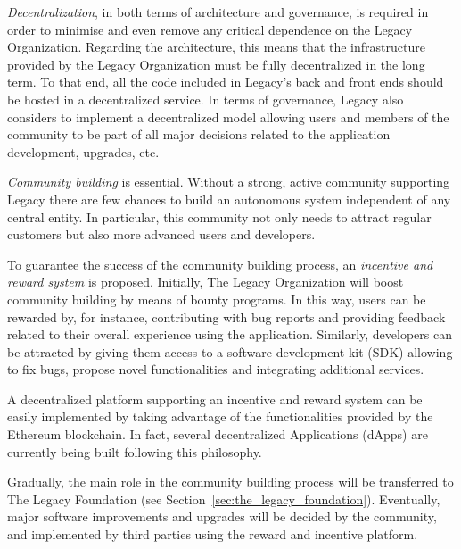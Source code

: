 \textit{Decentralization}, in both terms of architecture and governance, is required in order to minimise and even remove any critical dependence on the Legacy Organization.
Regarding the architecture, this means that the infrastructure provided by the Legacy Organization must be fully decentralized in the long term. To that end, all the code included in Legacy's back and front ends should be hosted in a decentralized service.
In terms of governance, Legacy also considers to implement a decentralized model allowing users and members of the community to be part of all major decisions related to the application development, upgrades, etc.

\textit{Community building} is essential. Without a strong, active community supporting Legacy there are few chances to build an autonomous system independent of any central entity. In particular, this community not only needs to attract regular customers but also more advanced users and developers.

To guarantee the success of the community building process, an \textit{incentive and reward system} is proposed.
Initially, The Legacy Organization will boost community building by means of bounty programs. In this way, users can be rewarded by, for instance, contributing with bug reports and providing feedback related to their overall experience using the application.
Similarly, developers can be attracted by giving them access to a software development kit (SDK) allowing to fix bugs, propose novel functionalities and integrating additional services.

A decentralized platform supporting an incentive and reward system can be easily implemented by taking advantage of the functionalities provided by the Ethereum blockchain. In fact, several decentralized Applications (dApps) are currently being built following this philosophy.

Gradually, the main role in the community building process will be transferred to The Legacy Foundation (see Section~\ref{sec:the_legacy_foundation}). 
Eventually, major software improvements and upgrades will be decided by the community, and implemented by third parties using the reward and incentive platform.






